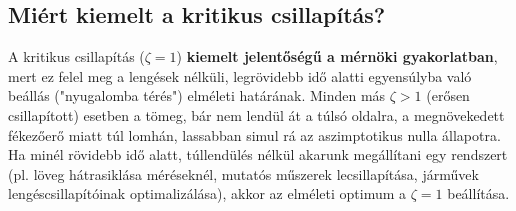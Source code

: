 \subsection*{Miért kiemelt a kritikus csillapítás?}
A kritikus csillapítás ($\zeta = 1$) \textbf{kiemelt jelentőségű a mérnöki gyakorlatban}, mert ez felel meg a lengések nélküli, legrövidebb idő alatti egyensúlyba való beállás ("nyugalomba térés") elméleti határának. Minden más $\zeta > 1$ (erősen csillapított) esetben a tömeg, bár nem lendül át a túlsó oldalra, a megnövekedett fékezőerő miatt túl lomhán, lassabban simul rá az aszimptotikus nulla állapotra. Ha minél rövidebb idő alatt, túllendülés nélkül akarunk megállítani egy rendszert (pl. löveg hátrasiklása méréseknél, mutatós műszerek lecsillapítása, járművek lengéscsillapítóinak optimalizálása), akkor az elméleti optimum a $\zeta=1$ beállítása.
